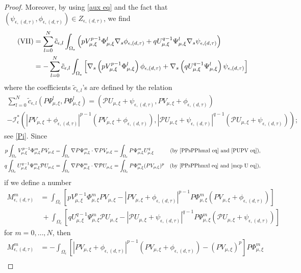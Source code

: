 \documentclass[reqno]{amsart}
\theoremstyle{remark}
\newcommand{\ep}{\epsilon}
\newcommand{\mci}{\mathcal{I}}
\newcommand{\mcp}{\mathcal{P}}
\newcommand{\tc}{\tilde{c}}
\newcommand{\mx}{{\mu,\xi}}
\renewcommand{\(}{\left(}
\renewcommand{\)}{\right)}
\numberwithin{equation}{section}
\begin{document}
\begin{proof}
Moreover, by using \eqref{aux eq} and the fact that $(\psi_{\ep,(d,\tau)},\phi_{\ep,(d,\tau)}) \in Z_{\ep,(d,\tau)}$, we find
\begin{equation}\label{IV eq}
\begin{aligned}
\textup{(VII)} &= \sum_{l=0}^N \tc_{\ep,l} \int_{\Omega_\ep} \(p V_\mx^{p-1} \Phi_\mx^l \nabla_s\phi_{\ep,(d,\tau)} + q U_\mx^{q-1} \Psi_\mx^l \nabla_s\psi_{\ep,(d,\tau)}\) \\
&= - \sum_{l=0}^N \tc_{\ep,l} \int_{\Omega_\ep} \left[\nabla_s\(p V_\mx^{p-1} \Phi_\mx^l\) \phi_{\ep,(d,\tau)} + \nabla_s\(q U_\mx^{q-1} \Psi_\mx^l\) \psi_{\ep,(d,\tau)}\right]
\end{aligned}
\end{equation}
where the coefficients $\tc_{\ep,l}$'s are defined by the relation
\begin{multline*}
\sum_{l=0}^N \tc_{\ep,l} \(P\Psi_\mx^l,P\Phi_\mx^l\) = \(\mcp U_\mx+\psi_{\ep,(d,\tau)}, PV_\mx+\phi_{\ep,(d,\tau)}\) \\
- \mci^*_\ep\(|PV_\mx+\phi_{\ep,(d,\tau)}|^{p-1} \(PV_\mx+\phi_{\ep,(d,\tau)}\),|\mcp U_\mx+\psi_{\ep,(d,\tau)}|^{q-1} \(\mcp U_\mx+\psi_{\ep,(d,\tau)}\)\);
\end{multline*}
see \eqref{Pi}. Since
\begin{align*}
p\int_{\Omega_\ep} V_\mx^{p-1} \Phi_\mx^m PV_\mx &= \int_{\Omega_\ep} \nabla P\Psi_\mx^m \cdot \nabla PV_\mx = \int_{\Omega_\ep} P\Psi_\mx^m U_\mx^q &(\textup{by } \eqref{PPsPPhmxl eq} \text{ and } \eqref{PUPV eq}), \\
q\int_{\Omega_\ep} U_\mx^{q-1} \Psi_\mx^m \mcp U_\mx &= \int_{\Omega_\ep} \nabla P\Phi_\mx^m \cdot \nabla \mcp U_\mx = \int_{\Omega_\ep} P\Phi_\mx^m (PV_\mx)^p &(\textup{by } \eqref{PPsPPhmxl eq} \text{ and } \eqref{mcp U eq}),
\end{align*}
if we define a number
\begin{align*}
M_{\ep,(d,\tau)}^m &= \int_{\Omega_\ep} \left[pV_\mx^{p-1} \Phi_\mx^m PV_\mx - |PV_\mx+\phi_{\ep,(d,\tau)}|^{p-1} P\Phi_\mx^m \(PV_\mx+\phi_{\ep,(d,\tau)}\)\right] \\
&\ + \int_{\Omega_\ep} \left[qU_\mx^{q-1} \Psi_\mx^m \mcp U_\mx - |\mcp U_\mx+\psi_{\ep,(d,\tau)}|^{q-1} P\Psi_\mx^m \(\mcp U_\mx+\psi_{\ep,(d,\tau)}\)\right]
\end{align*}
for $m = 0,\ldots,N$, then
\begin{equation}\label{Am1}
\begin{aligned}
M_{\ep,(d,\tau)}^m &= - \int_{\Omega_\ep} \left[|PV_\mx+\phi_{\ep,(d,\tau)}|^{p-1} \(PV_\mx+\phi_{\ep,(d,\tau)}\)-(PV_\mx)^p\right] P\Phi_\mx^m \\

\end{aligned}
\end{equation}
\end{proof}
\end{document}
